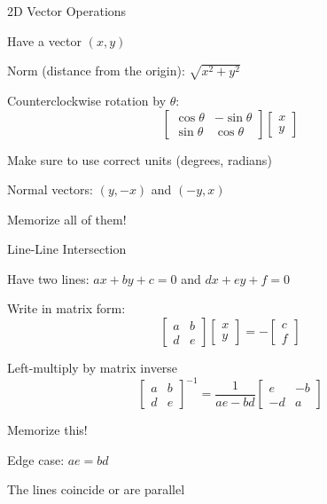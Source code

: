 \documentclass[13pt,onlymath]{beamer}
\begin{document}
\begin{frame}{2D Vector Operations}
\BIT
\item Have a vector $(x, y)$
\item Norm (distance from the origin): $\sqrt{x^2+y^2}$
\item Counterclockwise rotation by $\theta$:
\[
\left[ \begin{array}{cc} \cos \theta & -\sin \theta \\ \sin \theta & \cos \theta \end{array}\right]
\left[ \begin{array}{c} x \\ y \end{array}\right]
\]
\BIT
\item Make sure to use correct units (degrees, radians)
\EIT
\item Normal vectors: $(y, -x)$ and $(-y, x)$

\item Memorize all of them!
\EIT
\end{frame}

\begin{frame}{Line-Line Intersection}
\BIT
\item Have two lines: $ax+by+c=0$ and $dx+ey+f=0$
\item Write in matrix form:
\[
\left[ \begin{array}{cc} a & b \\ d & e \end{array}\right]
\left[ \begin{array}{c} x \\ y \end{array}\right]
=
-\left[ \begin{array}{c} c \\ f \end{array}\right]
\]
\item Left-multiply by matrix inverse
\[
\left[ \begin{array}{cc} a & b \\ d & e \end{array}\right]^{-1} =
\frac{1}{ae-bd}\left[ \begin{array}{cc} e & -b \\ -d & a \end{array}\right]
\]
\BIT
\item Memorize this!
\EIT
\item Edge case: $ae=bd$
\BIT
\item The lines coincide or are parallel
\EIT
\EIT
\end{frame}
\end{document}
